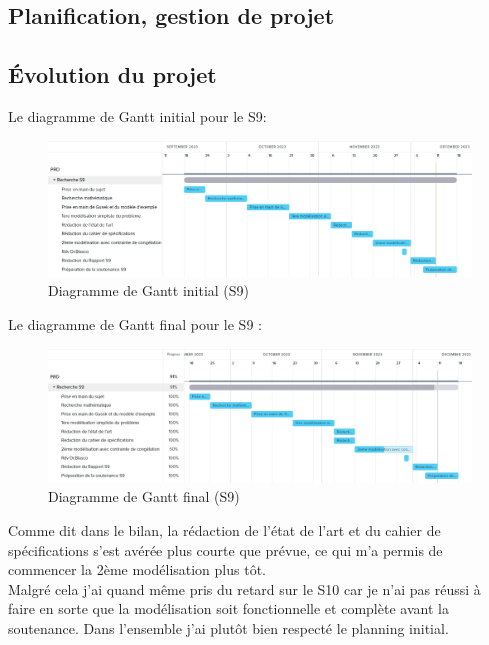 \documentclass{polytech/polytech}
\numberwithin{figure}{chapter}
\begin{document}
\begin{appendix}

\chapter{Planification, gestion de projet}   

\section{Évolution du projet}

Le diagramme de Gantt initial pour le S9:
\begin{figure}[ht]
    \centering
    \includegraphics[width=\textwidth]{pic/gantts91.png}
    \caption{Diagramme de Gantt initial (S9)}
\end{figure}

Le diagramme de Gantt final pour le S9 :
\begin{figure}[ht]
    \centering
    \includegraphics[width=\textwidth]{pic/gantts92.png}
    \caption{Diagramme de Gantt final (S9)}
\end{figure}

Comme dit dans le bilan, la rédaction de l'état de l'art et du cahier de spécifications s'est avérée plus courte que prévue, ce qui m'a permis de commencer la 2ème modélisation plus tôt.\\
Malgré cela j'ai quand même pris du retard sur le S10 car je n'ai pas réussi à faire en sorte que la modélisation soit fonctionnelle et complète avant la soutenance.
Dans l'ensemble j'ai plutôt bien respecté le planning initial.\\


\end{appendix}
\end{document}
